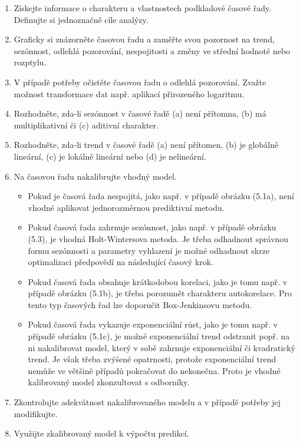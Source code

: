 \begin{enumerate}
\item Získejte informace o charakteru a vlastnostech podkladové časové řady. Definujte si jednoznačně cíle analýzy.
\item Graficky si znázorněte časovou řadu a zaměřte svou pozornost na trend, sezónnost, odlehlá pozorování, nespojitosti a změny ve střední hodnotě nebo rozptylu.
\item V případě potřeby očistěte časovou řadu o odlehlá pozorování. Zvažte možnost transformace dat např. aplikací přirozeného logaritmu.
\item Rozhodněte, zda-li sezónnost v časové řadě (a) není přítomna, (b) má multiplikativní či (c) aditivní charakter.
\item Rozhodněte, zda-li trend v časové řadě (a) není přítomen, (b) je globálně lineární, (c) je lokálně lineární nebo (d) je nelineární.
\item Na časovou řadu nakalibrujte vhodný model.
\begin{itemize}
\item Pokud je časová řada nespojitá, jako např. v případě obrázku (5.1a), není vhodné aplikovat jednorozměrnou prediktivní metodu.
\item Pokud časová řada zahrnuje sezónnost, jako např. v případě obrázku (5.3), je vhodná Holt-Wintersova metoda. Je třeba odhadnout správnou formu sezónnosti a parametry vyhlazení je možné odhadnout skrze optimalizaci předpovědí na následující časový krok.
\item Pokud časová řada obsahuje krátkodobou korelaci, jako je tomu např. v případě obrázku (5.1b), je třeba porozumět charakteru autokorelace. Pro tento typ časových řad lze doporučit Box-Jenkinsovu metodu.
\item Pokud časová řada vykazuje exponenciální růst, jako je tomu např. v případě obrázku (5.1c), je možné exponenciální trend odstranit popř. na ni nakalibrovat model, který v sobě zahrnuje exponenciální či kvadratický trend. Je však třeba zvýšené opatrnosti, protože exponenciální trend nemůže ve většině případů pokračovat do nekonečna. Proto je vhodné kalibrovaný model zkonzultovat s odborníky.
\end{itemize}
\item Zkontrolujte adekvátnost nakalibrovaného modelu a v případě potřeby jej modifikujte.
\item Využijte zkalibrovaný model k výpočtu predikcí.
\end{enumerate}

